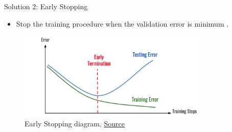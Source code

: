 \documentclass[compress,oilve,t]{beamer}
\newcommand{\tc}[2]{
	\textcolor{#1}{\hspace{-2pt}#2\hspace{-2pt}}
}
\begin{document}
\begin{frame}{Solution 2: Early Stopping}
	\begin{itemize}
		\item Stop the training procedure when the validation error is \tc{keywords}{minimum}.
	\end{itemize}
	\vspace{0.1\textheight}
	\begin{figure}
		\centering
		\includegraphics[width=0.8\textwidth]{Figs/Early Stopping.png}
		\caption{Early Stopping diagram, \href{https://medium.com/analytics-v7idhya/early-stopping-with-pytorch-to-restrain-your-model-from-overfitting-dce6de4081c5}{Source}}
	\end{figure}
\end{frame}
\end{document}

